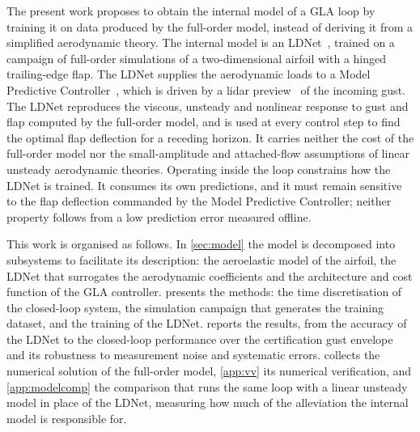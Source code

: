 The present work proposes to obtain the internal model of a GLA loop by training it on data produced by the full-order model, instead of deriving it from a simplified aerodynamic theory. The internal model is an LDNet~\cite{Regazzoni}, trained on a campaign of full-order simulations of a two-dimensional airfoil with a hinged trailing-edge flap. The LDNet supplies the aerodynamic loads to a Model Predictive Controller~\cite{rawlings2017mpc}, which is driven by a lidar preview~\cite{rabadan2010lidar,fezans2017lidar} of the incoming gust. The LDNet reproduces the viscous, unsteady and nonlinear response to gust and flap computed by the full-order model, and is used at every control step to find the optimal flap deflection for a receding horizon. It carries neither the cost of the full-order model nor the small-amplitude and attached-flow assumptions of linear unsteady aerodynamic theories. Operating inside the loop constrains how the LDNet is trained. It consumes its own predictions, and it must remain sensitive to the flap deflection commanded by the Model Predictive Controller; neither property follows from a low prediction error measured offline.

This work is organised as follows. In \cref{sec:model} the model is decomposed into subsystems to facilitate its description: the aeroelastic model of the airfoil, the LDNet that surrogates the aerodynamic coefficients and the architecture and cost function of the GLA controller.  presents the methods: the time discretisation of the closed-loop system, the simulation campaign that generates the training dataset, and the training of the LDNet.  reports the results, from the accuracy of the LDNet to the closed-loop performance over the certification gust envelope and its robustness to measurement noise and systematic errors.  collects the numerical solution of the full-order model, \cref{app:vv} its numerical verification, and \cref{app:modelcomp} the comparison that runs the same loop with a linear unsteady model in place of the LDNet, measuring how much of the alleviation the internal model is responsible for.
